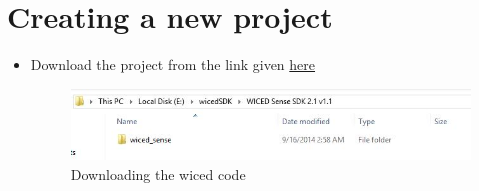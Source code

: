 \documentclass[11pt,a4paper]{article}
\begin{document}
\section{Creating a new project}
 \begin{itemize}
 \item Download the project from the link given
\href{https://community.cypress.com/docs/DOC-2213}{here}
 
 
  \begin{figure}[h]
    \centering
	\includegraphics[scale=0.6]{download.JPG}
	\caption{Downloading the wiced code}
	\end{figure}
 \end{itemize} 
 
\end{document}

